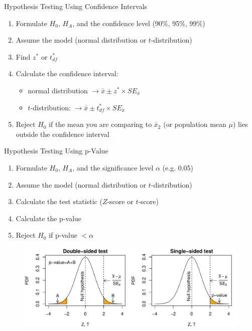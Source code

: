 \begin{frame}{Hypothesis Testing Using Confidence Intervals}

\begin{enumerate}
    \item Formulate $H_0$, $H_A$, and the confidence level (90\%, 95\%, 99\%)
    \item Assume the model (normal distribution or $t$-distribution)
    \item Find $z^*$ or $t_{df}^*$
    \item Calculate the confidence interval:
    \begin{itemize}
        \item normal distribution $\rightarrow \bar{x} \pm z^* \times SE_{\bar{x}}$\\
        \item $t$-distribution: $\rightarrow \bar{x} \pm t_{df}^* \times SE_{\bar{x}}$
    \end{itemize}
    \item Reject $H_0$ if the mean you are comparing to $\bar{x}_2$ (or population mean $\mu$) lies outside the confidence interval
\end{enumerate}

\end{frame}

\begin{frame}{Hypothesis Testing Using p-Value}

    \begin{enumerate}
        \item Formulate $H_0$, $H_A$, and the significance level $\alpha$ (e.g. 0.05)
        \item Assume the model (normal distribution or $t$-distribution)
        \item Calculate the test statistic ($Z$-score or $t$-score)
        \item Calculate the p-value
        \item Reject $H_0$ if p-value $< \alpha$
    \end{enumerate}
    \begin{figure}
        \includegraphics[width=\linewidth]{R/plots/hypothesis_testing}
    \end{figure}

\end{frame}

